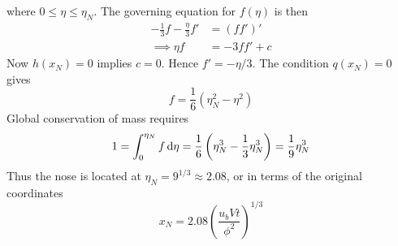 \documentclass{jknotes}
\begin{document}
where $0 \le \eta \le \eta_N$. The governing equation for $f(\eta)$ is then
\begin{align}
	-\frac{1}{3}f - \frac{\eta}{3}f' &= (ff')' \\
	\implies \eta f &= -3ff' + c
\end{align}
Now $h(x_N) = 0$ implies $c=0$. Hence $f' = -\eta/3$. The condition $q(x_N) =
0$ gives
\begin{equation}
	f = \frac{1}{6}\left(\eta^2_N - \eta^2\right)
\end{equation}
Global conservation of mass requires
\begin{equation}
	1 = \int_0^{\eta_N} f  \, \diffd \eta = \frac{1}{6}\left( \eta_N^3 -
	\frac{1}{3}\eta_N^3\right) = \frac{1}{9}\eta_N^3
\end{equation}
Thus the nose is located at $\eta_N = 9^{1/3} \approx 2.08$, or in terms of
the original coordinates
\begin{equation}
	x_N= 2.08 \left( \frac{u_b V t}{\phi^2}\right)^{1/3}
\end{equation}
\end{document}
